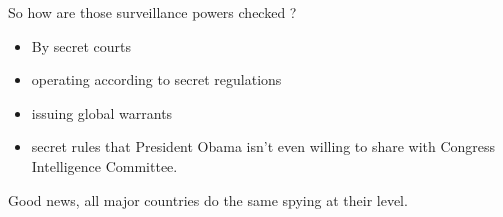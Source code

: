 \documentclass[compress]{beamer}
\theoremstyle{definition}
\theoremstyle{definition}
\theoremstyle{definition}
\theoremstyle{remark}
\theoremstyle{remark}
\theoremstyle{definition}
\theoremstyle{definition}
\theoremstyle{definition}
\theoremstyle{definition}
\theoremstyle{definition}
\theoremstyle{remark}
\theoremstyle{remark}
\theoremstyle{remark}
\theoremstyle{remark}
\begin{document}
			\begin{frame}
				\begin{block}{So how are those surveillance powers checked ?} 
				
					\begin{itemize}
						\item By secret courts 
						\vspace*{5mm}
						\item operating according to secret regulations 
						\vspace*{5mm}
						\item issuing global warrants
						\vspace*{5mm}
						\item secret rules that President Obama isn't even willing to share with Congress Intelligence Committee.
					\end{itemize}
				\end{block}
			\vspace*{15mm}
				\begin{alertblock}{}
					Good news, all major countries do the same spying at their level.
				\end{alertblock}
			\end{frame}
\end{document}
